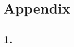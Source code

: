 \documentclass{report}
\theoremstyle{nonumberplain}
\begin{document}
\chapter*{Appendix}



\section*{1.}


\newpage

\end{document}
